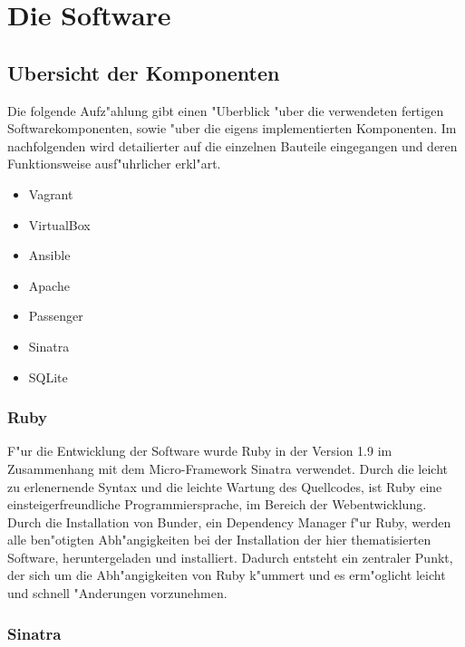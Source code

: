 \setcounter{secnumdepth}{3}
\chapter{Die Software}

\section{Ubersicht der Komponenten}
Die folgende Aufz"ahlung gibt einen "Uberblick "uber die verwendeten fertigen Softwarekomponenten, sowie "uber die eigens implementierten Komponenten.
Im nachfolgenden wird detailierter auf die einzelnen Bauteile eingegangen und deren Funktionsweise ausf"uhrlicher erkl"art.
\begin{itemize}
      \item Vagrant
      \item VirtualBox
      \item Ansible
      \item Apache
      \item Passenger
      \item Sinatra
      \item SQLite
 \end{itemize}

\subsection{Ruby}
F"ur die Entwicklung der Software wurde Ruby in der Version 1.9 im Zusammenhang mit dem Micro-Framework Sinatra verwendet.
Durch die leicht zu erlenernende Syntax und die leichte Wartung des Quellcodes, ist Ruby eine einsteigerfreundliche Programmiersprache, im Bereich der Webentwicklung.\newline 
Durch die Installation von Bunder, ein Dependency Manager f"ur Ruby, werden alle ben"otigten Abh"angigkeiten bei der Installation der hier thematisierten Software, heruntergeladen und installiert.
Dadurch entsteht ein zentraler Punkt, der sich um die Abh"angigkeiten von Ruby k"ummert und es erm"oglicht leicht und schnell "Anderungen vorzunehmen.

\subsection{Sinatra}



